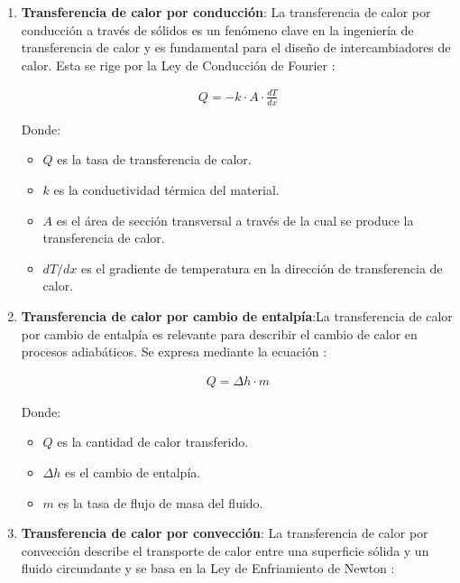 \documentclass[11pt,a4paper]{article}  %
\begin{document}
\begin{enumerate}
    \item \textbf{Transferencia de calor por conducción}: La transferencia de calor por conducción a través de sólidos es un fenómeno clave en la ingeniería de transferencia de calor y es fundamental para el diseño de intercambiadores de calor. Esta se rige por la Ley de Conducción de Fourier \cite{incropera2002}:

\begin{align}
Q = -k \cdot A \cdot \frac{dT}{dx}
\label{eq:conduccion}
\end{align}

Donde:
\begin{itemize}
    \item $Q$ es la tasa de transferencia de calor.
    \item $k$ es la conductividad térmica del material.
    \item $A$ es el área de sección transversal a través de la cual se produce la transferencia de calor.
    \item $dT/dx$ es el gradiente de temperatura en la dirección de transferencia de calor.
\end{itemize}


    \item \textbf{Transferencia de calor por cambio de entalpía}:La transferencia de calor por cambio de entalpía es relevante para describir el cambio de calor en procesos adiabáticos. Se expresa mediante la ecuación \cite{cengel2014}:

\begin{align}
Q = \Delta h \cdot m
\label{eq:entalpia}
\end{align}

Donde:
\begin{itemize}
    \item $Q$ es la cantidad de calor transferido.
    \item $\Delta h$ es el cambio de entalpía.
    \item $m$ es la tasa de flujo de masa del fluido.
\end{itemize}


    \item \textbf{Transferencia de calor por convección}: La transferencia de calor por convección describe el transporte de calor entre una superficie sólida y un fluido circundante y se basa en la Ley de Enfriamiento de Newton \cite{incropera2002}:


\end{enumerate}
\end{document}
